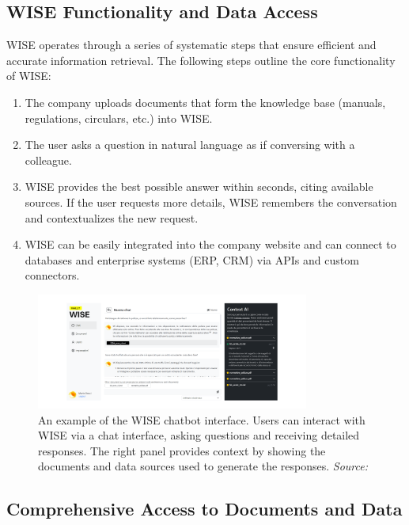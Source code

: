 \subsection{WISE Functionality and Data Access}

WISE operates through a series of systematic steps that ensure efficient and accurate information retrieval. The following steps outline the core functionality of WISE:

\begin{enumerate}
    \item The company uploads documents that form the knowledge base (manuals, regulations, circulars, etc.) into WISE.
    \item The user asks a question in natural language as if conversing with a colleague.
    \item WISE provides the best possible answer within seconds, citing available sources. If the user requests more details, WISE remembers the conversation and contextualizes the new request.
    \item WISE can be easily integrated into the company website and can connect to databases and enterprise systems (ERP, CRM) via APIs and custom connectors.
\end{enumerate}

\begin{figure}[h!]
    \centering
    \includegraphics[width=0.8\textwidth]{images/wise/wise-chat-UX.png}
    \caption{An example of the WISE chatbot interface. Users can interact with WISE via a chat interface, asking questions and receiving detailed responses. The right panel provides context by showing the documents and data sources used to generate the responses. \textit{Source:} \cite{hpa2024}}
    \label{fig:wise-chat-ux}
\end{figure}


\subsection{Comprehensive Access to Documents and Data}


